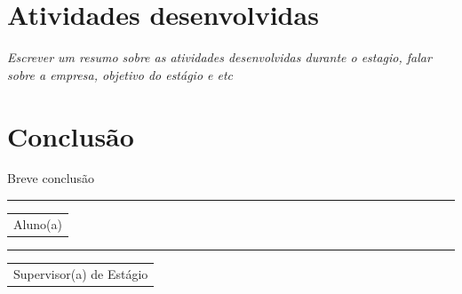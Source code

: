 \documentclass[12pt]{article}%
\newcommand\namegroup[1]{%
   \begin{minipage}[t]{0.4\textwidth}
   \vspace*{1.5cm}  %
   \hrule
   \vspace{1mm} %
   \centering
   \begin{tabular}[t]{c}
   #1
   \end{tabular}
   \end{minipage}}
\begin{document}
\section*{Atividades desenvolvidas}

\textit{Escrever um resumo sobre as atividades desenvolvidas durante o estagio, falar sobre a empresa, objetivo do estágio e etc }

\section*{Conclusão}

Breve conclusão


 \newpage

  
  
\begin{center}
\namegroup{Aluno(a)}
\hspace{1.5cm}
\namegroup{Supervisor(a) de Estágio}

\end{center}
  
  
  
\end{document}
